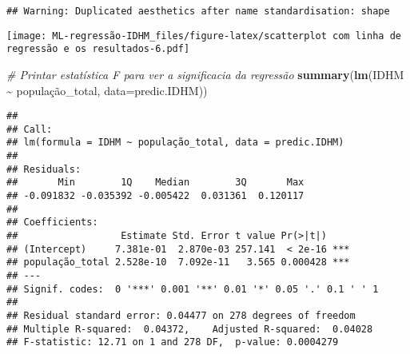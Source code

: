 \documentclass[
]{article}
\newenvironment{Shaded}{\begin{snugshade}}{\end{snugshade}}
\newcommand{\AttributeTok}[1]{\textcolor[rgb]{0.13,0.29,0.53}{#1}}
\newcommand{\CommentTok}[1]{\textcolor[rgb]{0.56,0.35,0.01}{\textit{#1}}}
\newcommand{\FunctionTok}[1]{\textcolor[rgb]{0.13,0.29,0.53}{\textbf{#1}}}
\newcommand{\NormalTok}[1]{#1}
\newcommand{\SpecialCharTok}[1]{\textcolor[rgb]{0.81,0.36,0.00}{\textbf{#1}}}
\begin{document}
\begin{verbatim}
## Warning: Duplicated aesthetics after name standardisation: shape
\end{verbatim}

\texttt{[image: ML-regressão-IDHM\_files/figure-latex/scatterplot com linha de regressão e os resultados-6.pdf]}

\begin{Shaded}
\begin{Highlighting}[]
\CommentTok{\# Printar estatística F para ver a significacia da regressão}
\FunctionTok{summary}\NormalTok{(}\FunctionTok{lm}\NormalTok{(IDHM }\SpecialCharTok{\textasciitilde{}}\NormalTok{ população\_total, }\AttributeTok{data=}\NormalTok{predic.IDHM))}
\end{Highlighting}
\end{Shaded}

\begin{verbatim}
## 
## Call:
## lm(formula = IDHM ~ população_total, data = predic.IDHM)
## 
## Residuals:
##       Min        1Q    Median        3Q       Max 
## -0.091832 -0.035392 -0.005422  0.031361  0.120117 
## 
## Coefficients:
##                  Estimate Std. Error t value Pr(>|t|)    
## (Intercept)     7.381e-01  2.870e-03 257.141  < 2e-16 ***
## população_total 2.528e-10  7.092e-11   3.565 0.000428 ***
## ---
## Signif. codes:  0 '***' 0.001 '**' 0.01 '*' 0.05 '.' 0.1 ' ' 1
## 
## Residual standard error: 0.04477 on 278 degrees of freedom
## Multiple R-squared:  0.04372,    Adjusted R-squared:  0.04028 
## F-statistic: 12.71 on 1 and 278 DF,  p-value: 0.0004279
\end{verbatim}
\end{document}
